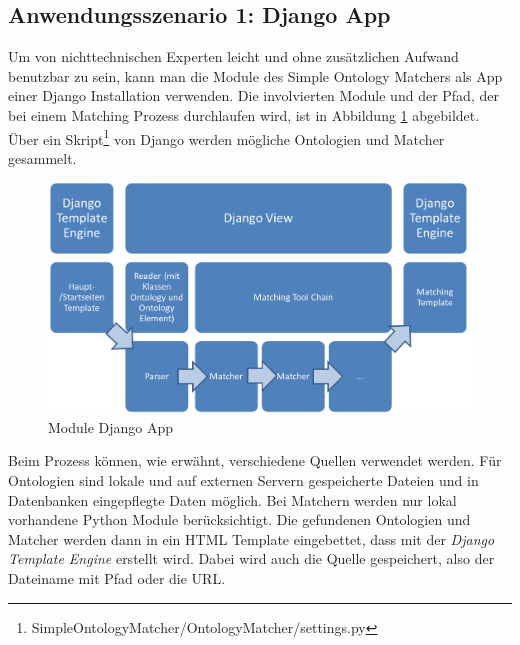 		\cleardoublepage
		\pagebreak[4]
		
		\subsection{Anwendungsszenario 1: Django App}
		Um von nichttechnischen Experten leicht und ohne zusätzlichen Aufwand
		benutzbar zu sein, kann man die Module des Simple Ontology Matchers als App
		einer Django Installation verwenden. Die involvierten Module und der
		Pfad, der bei einem Matching Prozess durchlaufen wird, ist in Abbildung
		\ref{fig3} abgebildet. Über ein
		Skript\footnote{SimpleOntologyMatcher/OntologyMatcher/settings.py} von Django
		werden mögliche Ontologien und Matcher gesammelt.
		
		\begin{figure}[h!]
		\centering
		\includegraphics[width=1.0\textwidth]{pics/Module-overview1.png}
		\caption{Module Django App}
		\label{fig3}
		\end{figure}
		
		Beim Prozess können, wie erwähnt, verschiedene Quellen verwendet werden. Für
		Ontologien sind lokale und auf externen Servern gespeicherte Dateien und in
		Datenbanken eingepflegte Daten möglich. Bei Matchern werden nur lokal
		vorhandene Python Module berücksichtigt. Die gefundenen Ontologien und Matcher werden dann in
		ein HTML Template eingebettet, dass mit der \textit{Django Template Engine}
		erstellt wird. Dabei wird auch die Quelle gespeichert, also der Dateiname mit Pfad oder die URL.
		
		\pagebreak[4]
		

